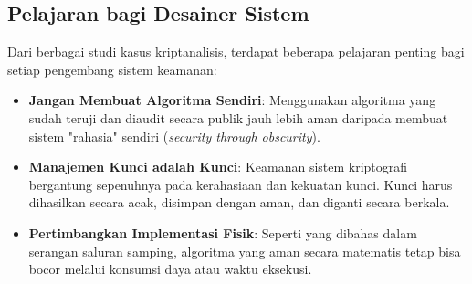 \subsection{Pelajaran bagi Desainer Sistem}

Dari berbagai studi kasus kriptanalisis, terdapat beberapa pelajaran penting bagi setiap pengembang sistem keamanan:

\begin{itemize}
    \item \textbf{Jangan Membuat Algoritma Sendiri}: Menggunakan algoritma yang sudah teruji dan diaudit secara publik jauh lebih aman daripada membuat sistem "rahasia" sendiri (\textit{security through obscurity}).
    \item \textbf{Manajemen Kunci adalah Kunci}: Keamanan sistem kriptografi bergantung sepenuhnya pada kerahasiaan dan kekuatan kunci. Kunci harus dihasilkan secara acak, disimpan dengan aman, dan diganti secara berkala.
    \item \textbf{Pertimbangkan Implementasi Fisik}: Seperti yang dibahas dalam serangan saluran samping, algoritma yang aman secara matematis tetap bisa bocor melalui konsumsi daya atau waktu eksekusi.
\end{itemize}

